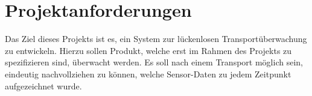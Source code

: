 \section{Projektanforderungen}
\label{sec:requirements}

Das Ziel dieses Projekts ist es, ein System zur lückenlosen Transportüberwachung
	zu entwickeln. Hierzu sollen Produkt, welche erst im Rahmen des Projekts zu
	spezifizieren sind, überwacht werden. Es soll nach einem Transport möglich
	sein, eindeutig nachvollziehen zu können, welche Sensor-Daten zu jedem
	Zeitpunkt aufgezeichnet wurde.